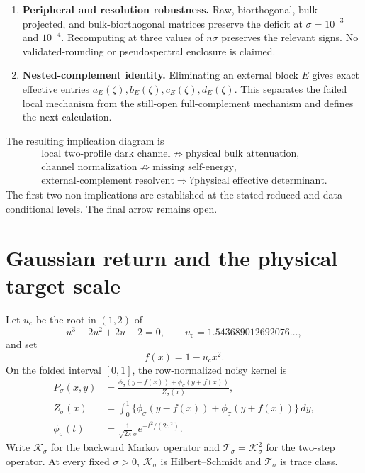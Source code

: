 \documentclass[11pt]{article}
\theoremstyle{definition}
\theoremstyle{remark}
\newcommand{\uc}{u_{\mathrm c}}
\newcommand{\cK}{\mathcal K}
\newcommand{\cT}{\mathcal T}
\begin{document}
\begin{enumerate}[label=\textbf{S\arabic*.},leftmargin=3.2em]
 \item \textbf{Peripheral and resolution robustness.}
 Raw, biorthogonal, bulk-projected, and bulk-biorthogonal matrices preserve
 the deficit at $\sigma=10^{-3}$ and $10^{-4}$.  Recomputing at three values
 of $n\sigma$ preserves the relevant signs.  No validated-rounding or
 pseudospectral enclosure is claimed.

 \item \textbf{Nested-complement identity.}
 Eliminating an external block $E$ gives exact effective entries
 $a_E(\zeta),b_E(\zeta),c_E(\zeta),d_E(\zeta)$.  This separates the failed
 local mechanism from the still-open full-complement mechanism and defines
 the next calculation.
\end{enumerate}

The resulting implication diagram is
\begin{equation}\label{eq:intro-diagram}
 \boxed{
 \begin{gathered}
 \text{local two-profile dark channel}
 \not\Longrightarrow
 \text{physical bulk attenuation},\\
 \text{channel normalization}
 \not\Longrightarrow
 \text{missing self-energy},\\
 \text{external-complement resolvent}
 \Longrightarrow?
 \text{physical effective determinant}.
 \end{gathered}}
\end{equation}
The first two non-implications are established at the stated reduced and
data-conditional levels.  The final arrow remains open.

\section{Gaussian return and the physical target scale}
\label{sec:setup}

Let $\uc$ be the root in $(1,2)$ of
\begin{equation}\label{eq:cubic-parameter}
 u^3-2u^2+2u-2=0,
 \qquad
 \uc=1.543689012692076\ldots,
\end{equation}
and set
\begin{equation}\label{eq:quadratic-map}
 f(x)=1-\uc x^2.
\end{equation}
On the folded interval $[0,1]$, the row-normalized noisy kernel is
\begin{align}
 P_\sigma(x,y)
 &=\frac{\phi_\sigma(y-f(x))+\phi_\sigma(y+f(x))}{Z_\sigma(x)},
 \label{eq:kernel}\\
 Z_\sigma(x)
 &=\int_0^1\{\phi_\sigma(y-f(x))+\phi_\sigma(y+f(x))\}\,dy,
 \label{eq:normalizer}\\
 \phi_\sigma(t)&=\frac{1}{\sqrt{2\pi}\sigma}
 e^{-t^2/(2\sigma^2)}.
 \label{eq:normal-density}
\end{align}
Write $\cK_\sigma$ for the backward Markov operator and
$\cT_\sigma=\cK_\sigma^2$ for the two-step operator.  At every fixed
$\sigma>0$, $\cK_\sigma$ is Hilbert--Schmidt and $\cT_\sigma$ is trace
class.
\end{document}
